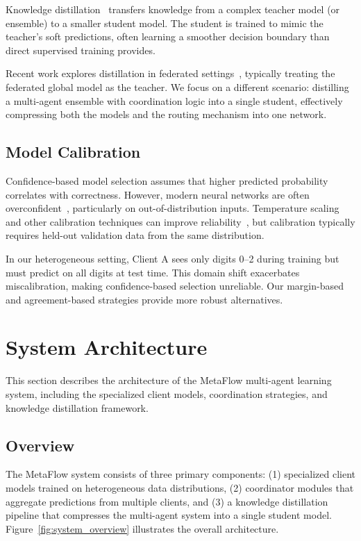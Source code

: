 \documentclass[12pt]{article}
\begin{document}
Knowledge distillation~\cite{hinton2015distilling} transfers knowledge from a complex teacher model (or ensemble) to a smaller student model. The student is trained to mimic the teacher's soft predictions, often learning a smoother decision boundary than direct supervised training provides.

Recent work explores distillation in federated settings~\cite{li2019fedmd, lin2020ensemble}, typically treating the federated global model as the teacher. We focus on a different scenario: distilling a multi-agent ensemble with coordination logic into a single student, effectively compressing both the models and the routing mechanism into one network.

\subsection{Model Calibration}

Confidence-based model selection assumes that higher predicted probability correlates with correctness. However, modern neural networks are often overconfident~\cite{guo2017calibration}, particularly on out-of-distribution inputs. Temperature scaling and other calibration techniques can improve reliability~\cite{kumar2019verified}, but calibration typically requires held-out validation data from the same distribution.

In our heterogeneous setting, Client A sees only digits 0--2 during training but must predict on all digits at test time. This domain shift exacerbates miscalibration, making confidence-based selection unreliable. Our margin-based and agreement-based strategies provide more robust alternatives.

\section{System Architecture}
\label{sec:architecture}

This section describes the architecture of the MetaFlow multi-agent learning system, including the specialized client models, coordination strategies, and knowledge distillation framework.

\subsection{Overview}
\label{subsec:overview}

The MetaFlow system consists of three primary components: (1) specialized client models trained on heterogeneous data distributions, (2) coordinator modules that aggregate predictions from multiple clients, and (3) a knowledge distillation pipeline that compresses the multi-agent system into a single student model. Figure~\ref{fig:system_overview} illustrates the overall architecture.
\end{document}
